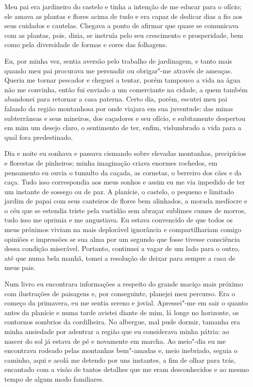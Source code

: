 Meu pai era jardineiro do castelo e tinha a intenção de me educar para o
ofício; ele amava as plantas e flores acima de tudo e era capaz de
dedicar dias a fio aos seus cuidados e cautelas. Chegava a ponto de
afirmar que quase se comunicava com as plantas, pois, dizia, se
instruía pelo seu crescimento e prosperidade, bem como pela diversidade
de formas e cores das folhagens.

Eu, por minha vez, sentia aversão pelo trabalho de jardinagem, e tanto
mais quando meu pai procurava me persuadir ou obrigar"-me através de
ameaças. Queria me tornar pescador e cheguei a tentar, porém tampouco a
vida na água não me convinha, então fui enviado a um comerciante na cidade,
a quem também abandonei para retornar a casa paterna. Certo dia, porém,
escutei meu pai falando da região montanhosa por onde viajara em sua
juventude: das minas subterrâneas e seus mineiros, dos caçadores e seu
ofício, e subitamente despertou em mim um desejo claro, o sentimento de
ter, enfim, vislumbrado a vida para a qual fora predestinado.

Dia e noite eu sonhava e passava cismando sobre elevadas montanhas,
precipícios e florestas de \mbox{pinheiros}; minha imaginação criava enormes
rochedos, em pensamento eu ouvia o tumulto da caçada, as cornetas, o
berreiro dos cães e da caça. Tudo isso correspondia aos meus sonhos e
assim eu me via impedido de ter um instante de sossego ou de paz. A
planície, o castelo, o pequeno e limitado jardim de papai com seus
canteiros de flores bem alinhados, a morada medíocre e o céu que se
estendia triste pela vastidão sem abraçar sublimes cumes de morros,
tudo isso me oprimia e me angustiava. Eu estava convencido de que todos
os meus próximos viviam na mais deplorável ignorância e compartilhariam
comigo opiniões e impressões se sua alma por um segundo que fosse
tivesse consciência dessa condição miserável. Portanto, continuei a
vagar de um lado para o outro, até que numa bela manhã, tomei a
resolução de deixar para sempre a casa de meus pais.

Num livro eu encontrara informações a respeito do grande maciço mais
próximo com ilustrações de paisagens e, por conseguinte, planejei meu
percurso. Era o começo da primavera, eu me sentia sereno e jovial.
Apressei"-me em sair o quanto antes da planície e numa tarde avistei
diante de mim, lá longe no horizonte, os contornos sombrios da
cordilheira. No albergue, mal pude dormir, tamanha era minha ansiedade
por adentrar a região que eu considerava minha pátria: ao nascer do sol
já estava de pé e novamente em marcha. Ao meio"-dia eu me encontrava
rodeado pelas montanhas bem"-amadas e, meio inebriado, seguia o caminho,
aqui e acolá me detendo por uns instantes, a fim de olhar para trás,
encantado com a visão de tantos detalhes que me eram desconhecidos e ao
mesmo tempo de algum modo familiares.

